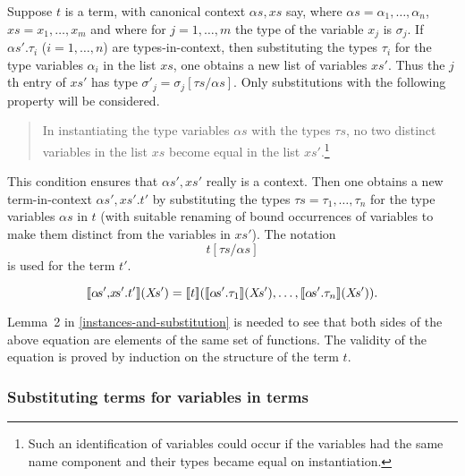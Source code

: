 Suppose $t$ is a term, with canonical context $\alpha\!s,\!x\!s$ say,
where $\alpha\!s = \alpha_1,\ldots,\alpha_n$, $x\!s = x_1,\ldots,x_m$
and where for $j=1,\ldots,m$ the type of the variable $x_j$ is
$\sigma_j$. If $\alpha\!s'.\tau_{i}$ ($i=1,\ldots,n$) are
types-in-context, then substituting the types
$\tau_{i}$ for the type variables $\alpha_{i}$ in the list $x\!s$, one
obtains a new list of variables $x\!s'$. Thus the $j$\/th entry of
$x\!s'$ has type $\sigma'_{j} = \sigma_{j}[\tau\!s/\alpha\!s]$. Only
substitutions with the following property will be considered.
\begin{quote}
In instantiating the type variables $\alpha\!s$ with the types
$\tau\!s$, no two distinct variables in the list $x\!s$ become equal in
the list $x\!s'$.\footnote{Such an identification of variables could
occur if the variables had the same name component and their types
became equal on instantiation.}
\end{quote}
This condition ensures that $\alpha\!s',x\!s'$ really is a context. Then
one obtains a new term-in-context $\alpha\!s',\!x\!s'.t'$ by
substituting the types $\tau\!s=\tau_{1},\ldots,\tau_{n}$ for the type
variables $\alpha\!s$ in $t$ (with suitable renaming of bound
occurrences of variables to make them distinct from the variables in
$x\!s'$). The notation
\[
t[\tau\!s/\alpha\!s]
\]
is used for the term $t'$.

\medskip

\[
\den{\alpha\!s',\!x\!s'.t'}(X\!s') =
   \den{t}(\den{\alpha\!s'.\tau_{1}}(X\!s'),\ldots,
   \den{\alpha\!s'.\tau_{n}}(X\!s')).
\]

\medskip

Lemma~2 in \ref{instances-and-substitution} is needed to see that both
sides of the above equation are elements of the same set of functions.
The validity of the equation is proved by induction on the structure
of the term $t$.

\subsubsection*{Substituting terms for variables in terms}

